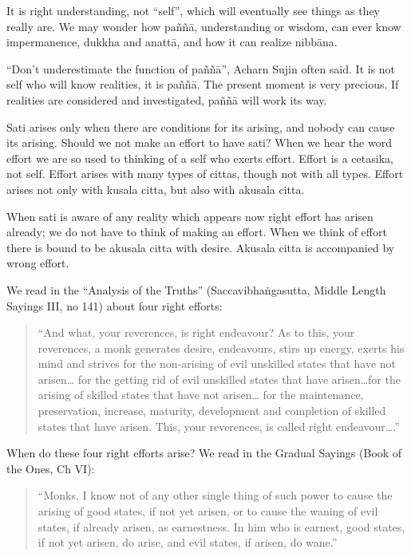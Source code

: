 It is right understanding, not ``self'', which will eventually see
things as they really are. We may wonder how paññā, understanding or
wisdom, can ever know impermanence, dukkha and anattā, and how it can
realize nibbāna.

``Don't underestimate the function of paññā'', Acharn Sujin often said.
It is not self who will know realities, it is paññā. The present moment
is very precious. If realities are considered and investigated, paññā
will work its way.

Sati arises only when there are conditions for its arising, and nobody
can cause its arising. Should we not make an effort to have sati? When
we hear the word effort we are so used to thinking of a self who exerts
effort. Effort is a cetasika, not self. Effort arises with many types of
cittas, though not with all types. Effort arises not only with kusala
citta, but also with akusala citta.

When sati is aware of any reality which appears now right effort has
arisen already; we do not have to think of making an effort. When we
think of effort there is bound to be akusala citta with desire. Akusala
citta is accompanied by wrong effort.

We read in the ``Analysis of the Truths'' (Saccavibhaṅgasutta, Middle
Length Sayings III, no 141) about four right efforts:

\begin{quote}

``And what, your reverences, is right endeavour? As to this, your
reverences, a monk generates desire, endeavours, stirs up energy, exerts
his mind and strives for the non-arising of evil unskilled states that
have not arisen\ldots{} for the getting rid of evil unskilled states
that have arisen\ldots{}for the arising of skilled states that have not
arisen\ldots{} for the maintenance, preservation, increase, maturity,
development and completion of skilled states that have arisen. This,
your reverences, is called right endeavour\ldots{}.''

\end{quote}

When do these four right efforts arise? We read in the Gradual Sayings
(Book of the Ones, Ch VI):

\begin{quote}
``Monks, I know not of any other single thing of such power to cause the
arising of good states, if not yet arisen, or to cause the waning of
evil states, if already arisen, as earnestness. In him who is earnest,
good states, if not yet arisen, do arise, and evil states, if arisen, do
wane.''
\end{quote}

